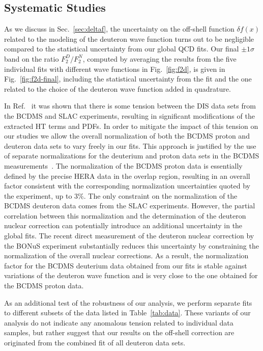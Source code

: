 \documentclass[%
      aps,
      prd,
      floatfix,
      preprintnumbers,
      preprint,
      showpacs,
      nofootinbib,
      tightenlines,
      amssymb,
      amsmath
]{revtex4-1}
\begin{document}
\subsection{Systematic Studies}
\label{sec:sys}

As we discuss in Sec.~\ref{sec:deltaf}, the uncertainty on the off-shell function $\delta f(x)$ 
related to the modeling of the deuteron wave function turns out to be negligible compared to the 
statistical uncertainty from our global QCD fits. 
Our final $\pm 1 \sigma$ band on the ratio $F_2^D/F_2^N$, computed 
by averaging the results from the five individual fits with 
different wave functions in Fig.~\ref{fig:f2d}, is given in Fig.~\ref{fig:f2d-final}, including 
the statistical uncertainty from the fit and the one related to the choice of the
deuteron wave function added in quadrature. 

In Ref.~\cite{Alekhin:2007fh} it was shown that there is some tension between the DIS data sets from the 
BCDMS and SLAC experiments, resulting in significant modifications of the extracted HT terms and PDFs. 
In order to mitigate the impact of this tension on our studies we allow the overall normalization of both 
the BCDMS proton and deuteron data sets to vary freely in our fits. This approach is justified by the use of separate 
normalizations for the deuterium and proton data sets in the BCDMS measurements~\cite{Benvenuti:1989rh,Benvenuti:1989fm}. 
The normalization of the BCDMS proton data is essentially defined by the precise HERA data in the overlap 
region, resulting in an overall factor consistent with the
corresponding normalization uncertainties quoted by the experiment, up to 3\%.  
% 
The only constraint on the normalization of the BCDMS deuteron data comes from the SLAC 
experiments. However, the partial correlation between this normalization and the determination of the  
deuteron nuclear correction can potentially introduce an additional uncertainty in the global fits. 
The recent direct measurement of the deuteron nuclear correction by the 
BONuS experiment substantially reduces this uncertainty by constraining the normalization of the 
overall nuclear corrections. As a result, the normalization factor for the BCDMS deuterium data 
obtained from our fits is stable against variations of the deuteron wave function and is very 
close to the one obtained for the BCDMS proton data.    

As an additional test of the robustness of our analysis, we perform separate fits to different subsets 
of the data listed in Table~\ref{tab:data}. These variants of our analysis do not indicate any 
anomalous tension related to individual data samples, but rather suggest that our results on the 
off-shell correction are originated from the combined fit of all deuteron data sets. 
\end{document}
